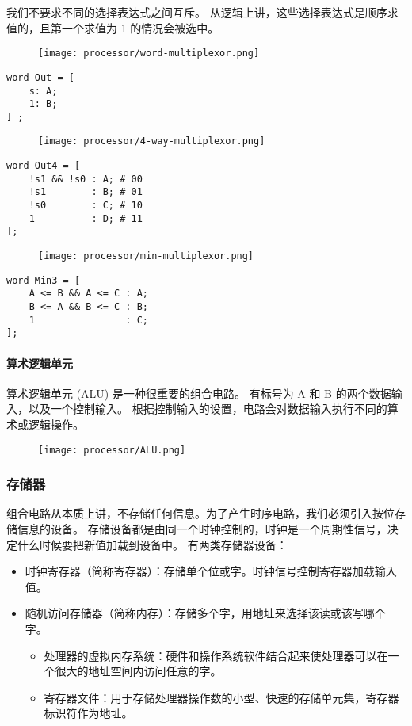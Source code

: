 我们不要求不同的选择表达式之间互斥。
从逻辑上讲，这些选择表达式是顺序求值的，且第一个求值为 1 的情况会被选中。
\begin{figure}[H]
    \centering
    \texttt{[image: processor/word-multiplexor.png]}
\end{figure}
\begin{lstlisting}[style=CStyle]
word Out = [
    s: A;
    1: B;
] ;
\end{lstlisting}
\begin{figure}[H]
    \centering
    \texttt{[image: processor/4-way-multiplexor.png]}
\end{figure}
\begin{lstlisting}[style=CStyle]
word Out4 = [
    !s1 && !s0 : A; # 00
    !s1        : B; # 01
    !s0        : C; # 10
    1          : D; # 11
];
\end{lstlisting}
\begin{figure}[H]
    \centering
    \texttt{[image: processor/min-multiplexor.png]}
\end{figure}
\begin{lstlisting}[style=CStyle]
word Min3 = [
    A <= B && A <= C : A;
    B <= A && B <= C : B;
    1                : C;
];
\end{lstlisting}

\paragraph{算术逻辑单元}

算术逻辑单元 (ALU) 是一种很重要的组合电路。
有标号为 A 和 B 的两个数据输入，以及一个控制输入。
根据控制输入的设置，电路会对数据输入执行不同的算术或逻辑操作。

\begin{figure}[H]
    \centering
    \texttt{[image: processor/ALU.png]}
\end{figure}


\subsubsection{存储器}
组合电路从本质上讲，不存储任何信息。为了产生时序电路，我们必须引入按位存储信息的设备。
存储设备都是由同一个时钟控制的，时钟是一个周期性信号，决定什么时候要把新值加载到设备中。
有两类存储器设备：
\begin{itemize}
    \item 时钟寄存器（简称寄存器）：存储单个位或字。时钟信号控制寄存器加载输入值。
    \item 随机访问存储器（简称内存）：存储多个字，用地址来选择该读或该写哪个字。
          \begin{itemize}
              \item 处理器的虚拟内存系统：硬件和操作系统软件结合起来使处理器可以在一个很大的地址空间内访问任意的字。
              \item 寄存器文件：用于存储处理器操作数的小型、快速的存储单元集，寄存器标识符作为地址。
          \end{itemize}
\end{itemize}

